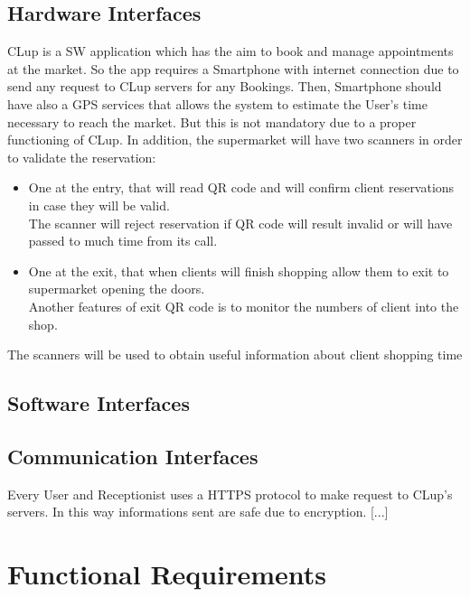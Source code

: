 \subsection{Hardware Interfaces}
CLup is a SW application which has the aim to book and manage appointments at the market. So the app requires a Smartphone with internet connection due to send any request to CLup servers for any Bookings. 
Then, Smartphone should have also a GPS services that allows the system to estimate the User's time necessary to reach the market. But this is not mandatory due to a proper functioning of CLup. 
In addition, the supermarket will have two scanners in order to validate the reservation:

\par \medskip 
\begin{itemize}
\item	One at the entry, that will read QR code and will confirm client reservations in case they will be valid. \\
The scanner will reject reservation if QR code will result invalid or will have passed to much time from its call.
\item One at the exit, that when clients will finish shopping allow them to exit to supermarket opening the doors. \\
Another features of exit QR code is to monitor the numbers of client into the shop.
\end{itemize} 
\par \medskip 
The scanners will be used to obtain useful information about client shopping time
\subsection{Software Interfaces}



\subsection{Communication Interfaces}
Every User and Receptionist uses a HTTPS protocol to make request to CLup's servers. In this way informations sent are safe due to encryption. [...]

\section{Functional Requirements}

